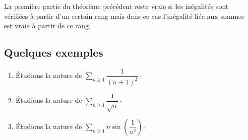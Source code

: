 \documentclass[french,11pt,twoside]{VcCours}
\newcommand{\Sum}[2]{\ensuremath{\textstyle{\sum\limits_{#1}^{#2}}}}
\begin{document}
\begin{Remarque}{} La première partie du théorème précédent reste vraie si les inégalités sont vérifiées à partir d'un certain rang mais dans ce cas l'inégalité liée aux sommes est vraie à partir de ce rang.
\end{Remarque}


\subsection{Quelques exemples}


\begin{Exemples}
\begin{enumerate}
	\item Étudions la nature de $\Sum{n \geq 1}{} \dfrac{1}{(n+1)^2}\cdot$

\vspace{3cm}
\item Étudions la nature de $\Sum{n \geq 1}{} \dfrac{1}{\sqrt{n}} \cdot$

\vspace{3cm}
%
\item Étudions la nature de $\Sum{n \geq 1}{} n \sin \left(\dfrac{1}{n^2}\right) \cdot$

\vspace{3cm}
%
\end{enumerate}
\end{Exemples}
\end{document}

